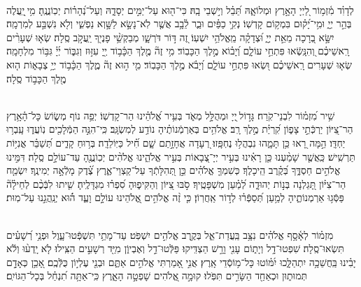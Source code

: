 \documentclass[twoside, openany, parskip=half, 11pt]{book}
\begin{document}
\\
 לְדָוִ֗ד מִ֫זְמ֥וֹר לַ֭יְיָ הָאָ֣רֶץ וּמְלוֹאָ֑הּ תֵּ֝בֵ֗ל וְי֣שְׁבֵי בָֽהּ׃ כִּי־ה֖וּא עַל־יַמִּ֣ים יְסָדָ֑הּ וְעַל־נְ֝הָר֗וֹת יְכֽוֹנֲנֶֽהָ׃ מִ֥י ֖יַֽעֲלֶה בְּהַ֣ר יְיָ֑ וּמִ֥י־יָ֝ק֗וּם בִּמְק֥וֹם קָדְשֽׁוֹ׃ נְקִ֥י כַפַּ֗יִם וּבַ֢ר לֵ֫בָ֥ב אֲשֶׁ֤ר לֹֽא־נָשָׂ֣א לַשָּׁ֣וְא נַפְשִׁ֑י וְלֹ֖א נִשְׁבַּ֣ע לְמִרְמָֽה׃ יִשָּׂ֣א בְ֭רָכָה מֵאֵ֣ת יְיָ֑ וּ֝צְדָקָ֗ה מֵֽאֱלֹהֵ֥י יִשְׁעֽוֹ׃ זֶ֭ה דּ֣וֹר דֹּרְשָׁ֑ו מְבַקְשֵׁ֥֨י פָנֶי֖ךָ יַֽעֲקֹ֣ב סֶֽלָה׃ שְׂא֤וּ שְׁעָרִ֨ים רָֽאשֵׁיכֶ֗ם וְ֭הִנָּֽשְֿׂאוּ פִּתְחֵ֣י עוֹלָ֑ם וְ֝יָב֗וֹא מֶ֣לֶךְ הַכָּבֽוֹד׃ מִ֥י זֶה֘ מֶ֤לֶךְ הַכָּ֫ב֥וֹד יְ֖יָ עִזּ֣וּז וְגִבּ֑וֹר יְ֜יָ֗ גִּבּ֥וֹר מִלְחָמָֽה׃ שְׂא֤וּ שְׁעָרִים רָֽאשֵׁיכֶ֗ם וּ֭שְׂאוּ פִּתְחֵ֣י עוֹלָ֑ם וְ֝יָבֹ֗א מֶ֣לֶךְ הַכָּבֽוֹד׃  מִ֤י ה֣וּא זֶה֘ מֶ֢לֶךְ הַכָּ֫ב֥וֹד יְיָ֥ צְבָא֑וֹת ה֤וּא מֶ֖לֶךְ הַכָּב֣וֹד סֶֽלָה׃ 


\\
 שִׁ֥יר מִ֝זְמ֗וֹר לִבְנֵי־קֹֽרַח׃ גָּד֣וֹל ֖יְיָ וּמְהֻלָּ֣ל מְאֹ֑ד בְּעִ֥יר אֱ֝לֹהֵ֗ינוּ הַר־קָדְשֽׁוֹ׃ יְפֵ֥ה נוֹף מְשׂ֢וֹשׂ כָּל־הָ֫אָ֥רֶץ הַר־צִ֭יּוֹן יַרְכְּֿתֵ֣י צָפ֑וֹן קִ֝רְיַ֗ת מֶ֣לֶךְ רָֽב׃ אֱלֹהִ֥ים בְּאַרְמְֿנוֹתֶ֗יהָ נוֹדַ֥ע לְמִשְׂגָּֽב׃ כִּֽי־הִנֵּ֣ה הַמְּֿלָכִ֖ים נֽוֹעֲד֑וּ עָֽבְר֥וּ יַחְדָּֽו׃ הֵ֣מָּה רָ֭אוּ כֵּ֥ן תָּמָ֑הוּ נִבְהֲל֥וּ נֶחְפָּֽזוּ׃ רְ֭עָדָה אֲחָזָ֣תַם שָׁ֑ם חִ֝֗יל כַּיּֽוֹלֵדָֽה׃ בְּר֥וּחַ קָדִ֑ים תְּ֝שַׁבֵּ֗ר אֳנִיּ֥וֹת תַּרְשִֽׁישׁ׃ כַּֽאֲשֶׁ֤ר שָׁמַ֨עְנוּ כֵּ֤ן רָאִ֗ינוּ בְּעִ֣יר יְיָ־צְ֭בָאוֹת בְּעִ֣יר אֱלֹהֵ֑ינוּ אֱלֹהִ֨ים יְכֽוֹנֲנֶ֖הָ עַד־עוֹלָ֣ם סֶֽלָה׃ דִּמִּ֣ינוּ אֱלֹהִ֣ים חַסְדֶּ֑ךָ בְּ֝קֶ֗רֶב הֵֽיכָלֶךָ׃ כְּשִׁמְךָ֤ אֱלֹהִ֗ים כֵּ֣ן תְּ֭הִלָּתְֿךָ עַל־קַצְוֵי־אֶ֑רֶץ צֶ֝֗דֶק מָלְֿאָ֣ה יְמִינֶֽךָ׃ יִשְׂמַ֤ח הַר־צִיּ֗וֹן תָּ֭גֵלְנָה בְּנ֣וֹת יְהוּדָ֑ה לְ֝מַ֗עַן מִשְׁפָּטֶֽיךָ׃ סֹ֣בּוּ צִ֭יּוֹן וְהַקִּיפ֑וּהָ סִ֝פְר֗וּ מִגְדָּלֶֽיהָ׃  שִׁ֤יתוּ לִבְּֿכֶ֨ם לְחֵילָ֗ה֘ פַּסְּֿג֥וּ אַרְמְנוֹתֶ֑יהָ לְמַ֥עַן תְּ֝סַפְּֿר֗וּ לְד֣וֹר אַֽחֲרֽוֹן׃ כִּ֤י זֶ֨ה אֱלֹהִ֣ים אֱ֭לֹהֵינוּ עוֹלָ֣ם וָעֶ֑ד ה֜֗וּא יְנַֽהֲגֵ֣נוּ עַל־מֽוּת׃ 


\\
 מִזְמ֗וֹר לְאָ֫סָ֥ף אֱלֹהִ֗ים נִצָּ֥ב בַּֽעֲדַת־אֵ֑ל בְּקֶ֖רֶב אֱלֹהִ֣ים יִשְׁפֹּֽט׃ עַד־מָתַ֥י תִּשְׁפְּֿטוּ־עָ֑וֶל וּפְנֵ֥י רְ֝שָׁעִ֗ים תִּשְׂאוּ־סֶֽלָה׃ שִׁפְטוּ־דָ֥ל וְיָת֑וֹם עָנִ֖י וָרָ֣שׁ הַצְדִּֽיקוּ׃ פַּלְּֿטוּ־דַ֣ל וְאֶבְיוֹ֑ן מִיַּ֖ד רְשָׁעִ֣ים הַצִּֽילוּ׃ לֹ֤א יָֽדְע֨וּ וְלֹ֬א יָבִ֗ינוּ בַּֽחֲשֵׁכָ֥ה יִתְהַלָּ֑כוּ יִ֝מּ֗וֹטוּ כָּל־מ֥וֹסְֿדֵי אָֽרֶץ׃ אֲנִ֣י אָ֭מַרְתִּי אֱלֹהִ֣ים אַתֶּ֑ם וּבְנֵ֖י עֶלְי֣וֹן כֻּלְּֿכֶֽם׃ אָ֭כֵ֥ן כְּאָדָ֣ם תְּמוּת֑וּן וּכְאַחַ֖ד הַשָּׂרִ֣ים תִּפֹּֽלוּ׃  קוּמָ֣ה אֱ֭לֹהִים שָׁפְטָ֣ה הָאָ֑רֶץ כִּֽי־אַתָּ֥ה תִ֝נְחַ֗ל בְּכָל־הַגּוֹיִֽם׃
\end{document}
